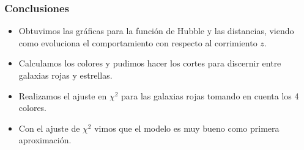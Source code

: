 \documentclass{beamer}
\begin{document}
\begin{frame}
\frametitle{Conclusiones}

\begin{itemize}
	\item Obtuvimos las gráficas para la función de Hubble y las distancias, viendo como evoluciona el comportamiento con respecto al corrimiento $z$.
	\item Calculamos los colores y pudimos hacer los cortes para discernir entre galaxias rojas y estrellas.
	\item Realizamos el ajuste en $\chi^2$ para las galaxias rojas tomando en cuenta los 4 colores.
	\item Con el ajuste de $\chi^2$ vimos que el modelo es muy bueno como primera aproximación. 
\end{itemize}

\end{frame}
\end{document}
